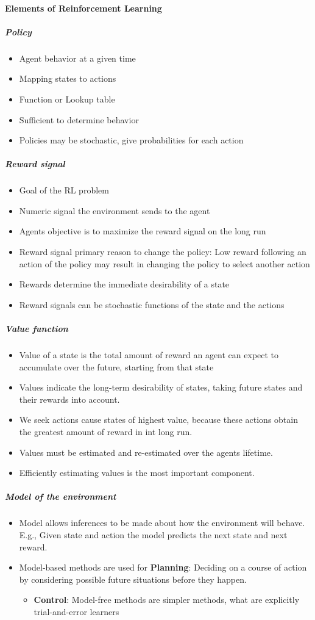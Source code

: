 \documentclass[12pt, article]{article}
\begin{document}
\paragraph{Elements of Reinforcement Learning}
\label{sec:org1efb30e}
\subparagraph{Policy}
\label{sec:org541b6bd}
\begin{itemize}
\item Agent behavior at a given time
\item Mapping states to actions
\item Function or Lookup table
\item Sufficient to determine behavior
\item Policies may be stochastic, give probabilities for each action
\end{itemize}
\subparagraph{Reward signal}
\label{sec:org6485859}
\begin{itemize}
\item Goal of the RL problem
\item Numeric signal the environment sends to the agent
\item Agents objective is to maximize the reward signal on the long run
\item Reward signal primary reason to change the policy: Low reward following an
action of the policy may result in changing the policy to select another action
\item Rewards determine the immediate desirability of a state
\item Reward signals can be stochastic functions of the state and the actions
\end{itemize}
\subparagraph{Value function}
\label{sec:org6366db4}
\begin{itemize}
\item Value of a state is the total amount of reward an agent can expect to
accumulate over the future, starting from that state
\item Values indicate the long-term desirability of states, taking future states and
their rewards into account.
\item We seek actions cause states of highest value, because these actions obtain
the greatest amount of reward in int long run.
\item Values must be estimated and re-estimated over the agents lifetime.
\item Efficiently estimating values is the most important component.
\end{itemize}
\subparagraph{Model of the environment}
\label{sec:orga263ad5}
\begin{itemize}
\item Model allows inferences to be made about how the environment will behave.
E.g., Given state and action the model predicts the next state and next reward.
\item Model-based methods are used for \textbf{\textbf{Planning}}: Deciding on a course of action by
considering possible future situations before they happen.
\begin{itemize}
\item \textbf{\textbf{Control}}: Model-free methods are simpler methods, what are explicitly trial-and-error learners
\end{itemize}
\end{itemize}
\end{document}
